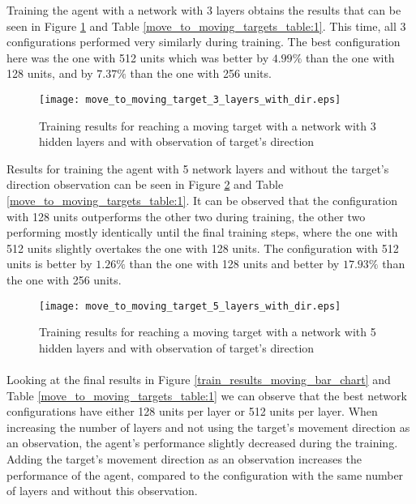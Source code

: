 Training the agent with a network with 3 layers obtains the results that can be seen in Figure \ref{train_results_moving_3_layers_with_dir} and Table \ref{move_to_moving_targets_table:1}. This time, all 3 configurations performed very similarly during training. The best configuration here was the one with 512 units which was better by $4.99\%$ than the one with 128 units, and by $7.37\%$ than the one with 256 units.

\begin{figure}
    \begin{center}
        \texttt{[image: move\_to\_moving\_target\_3\_layers\_with\_dir.eps]}
        \caption{Training results for reaching a moving target with a network with 3 hidden layers and with observation of target's direction}
        \label{train_results_moving_3_layers_with_dir}
    \end{center}
\end{figure}

Results for training the agent with 5 network layers and without the target's direction observation can be seen in Figure \ref{train_results_moving_5_layers_with_dir} and Table \ref{move_to_moving_targets_table:1}. It can be observed that the configuration with 128 units outperforms the other two during training, the other two performing mostly identically until the final training steps, where the one with 512 units slightly overtakes the one with 128 units. The configuration with 512 units is better by $1.26\%$ than the one with 128 units and better by $17.93\%$ than the one with 256 units.

\begin{figure}
    \begin{center}
        \texttt{[image: move\_to\_moving\_target\_5\_layers\_with\_dir.eps]}
        \caption{Training results for reaching a moving target with a network with 5 hidden layers and with observation of target's direction}
        \label{train_results_moving_5_layers_with_dir}
    \end{center}
\end{figure}


\paragraph{}
Looking at the final results in Figure \ref{train_results_moving_bar_chart} and Table \ref{move_to_moving_targets_table:1} we can observe that the best network configurations have either 128 units per layer or 512 units per layer. When increasing the number of layers and not using the target's movement direction as an observation, the agent's performance slightly decreased during the training. Adding the target's movement direction as an observation increases the performance of the agent, compared to the configuration with the same number of layers and without this observation. 


